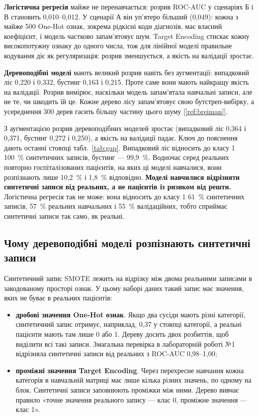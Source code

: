 \documentclass[14pt,a4paper]{extreport}
\begin{document}
\textbf{Логістична регресія} майже не перенавчається: розрив ROC-AUC у сценаріях Б і В становить 0,010--0,012. У сценарії А він уп'ятеро більший (0,049): кожна з майже 500 One-Hot ознак, зокрема рідкісні коди діагнозів, має власний коефіцієнт, і модель частково запам'ятовує шум. Target Encoding стискає кожну високопотужну ознаку до одного числа, тож для лінійної моделі правильне кодування діє як регуляризація: розрив зменшується, а якість на валідації зростає.

\textbf{Деревоподібні моделі} мають великий розрив навіть без аугментації: випадковий ліс 0,220 і 0,332, бустинг 0,163 і 0,215. Проте саме вони мають найкращу якість на валідації. Розрив вимірює, наскільки модель запам'ятала навчальні записи, але не те, чи шкодить їй це. Кожне дерево лісу запам'ятовує свою бутстреп-вибірку, а усереднення 300 дерев гасить більшу частину цього шуму [\ref{ref:breiman}].

З аугментацією розрив деревоподібних моделей зростає (випадковий ліс 0,364 і 0,371, бустинг 0,272 і 0,250), а якість на валідації падає. Ключ до пояснення дають останні стовпці табл.~\ref{tab:gap}. Випадковий ліс відносить до класу 1 100~\% синтетичних записів, бустинг --- 99,9~\%. Водночас серед реальних повторно госпіталізованих пацієнтів, на яких ці моделі навчалися, вони розпізнають лише 10,2~\% і 1,8~\% відповідно. \textbf{Моделі навчилися відрізняти синтетичні записи від реальних, а не пацієнтів із ризиком від решти.} Логістична регресія так не може: вона відносить до класу 1 61~\% синтетичних записів, 57~\% реальних навчальних і 55~\% валідаційних, тобто сприймає синтетичні записи так само, як реальні.

\subsection{Чому деревоподібні моделі розпізнають синтетичні записи}

Синтетичний запис SMOTE лежить на відрізку між двома реальними записами в закодованому просторі ознак. У цьому наборі даних такий запис має значення, яких не буває в реальних пацієнтів:

\begin{itemize}
\item \textbf{дробові значення One-Hot ознак}. Якщо два сусіди мають різні категорії, синтетичний запис отримує, наприклад, 0,37 у стовпці категорії, а реальні пацієнти мають там лише 0 або 1. Дереву досить двох розбиттів, щоб виділити всі такі записи. Змагальна перевірка в лабораторній роботі №1 відрізняла синтетичні записи від реальних з ROC-AUC 0,98--1,00;
\item \textbf{проміжні значення Target Encoding}. Через перехресне навчання кожна категорія в навчальній матриці має лише кілька різних значень, по одному на блок. Синтетичні записи заповнюють проміжки між ними. Дерево вивчає правило «точне значення реального запису --- клас 0, проміжне значення --- клас 1».
\end{itemize}
\end{document}
